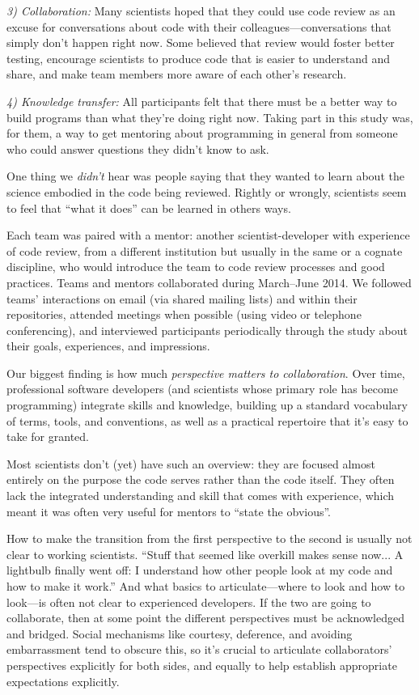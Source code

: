 \documentclass[10pt,twocolumn]{article}
\begin{document}
\noindent \emph{3) Collaboration:}
Many scientists hoped that they could use code review
as an excuse for conversations about code with their colleagues---conversations
that simply don't happen right now.
Some believed that review would foster better testing,
encourage scientists to produce code that is easier to understand and share,
and make team members more aware of each other's research.

\noindent \emph{4) Knowledge transfer:}
All participants felt that there must be a better way to build programs than what they're doing right now.
Taking part in this study was,
for them,
a way to get mentoring about programming in general from someone who could answer questions they didn't know to ask.

One thing we \emph{didn't} hear was people saying that
they wanted to learn about the science embodied in the code being reviewed.
Rightly or wrongly,
scientists seem to feel that ``what it does'' can be learned in others ways.

Each team was paired with a mentor:
another scientist-developer with experience of code review,
from a different institution but usually in the same or a cognate discipline,
who would introduce the team to code review processes and good practices.
Teams and mentors collaborated during March--June 2014.
We followed teams' interactions on email (via shared mailing lists) and within their repositories,
attended meetings when possible (using video or telephone conferencing),
and interviewed participants periodically through the study about their goals, experiences, and impressions.

Our biggest finding is how much \emph{perspective matters to collaboration}.
Over time,
professional software developers
(and scientists whose primary role has become programming)
integrate skills and knowledge,
building up a standard vocabulary of terms, tools, and conventions,
as well as a practical repertoire that it's easy to take for granted.

Most scientists don't (yet) have such an overview:
they are focused almost entirely on the purpose the code serves rather than the code itself.
They often lack the integrated understanding and skill that comes with experience,
which meant it was often very useful for mentors to ``state the obvious''.

How to make the transition from the first perspective to the second is usually not clear to working scientists.
``Stuff that seemed like overkill makes sense now...
A lightbulb finally went off:
I understand how other people look at my code and how to make it work.''
And what basics to articulate---where to look and how to look---is often not clear to experienced developers.
If the two are going to collaborate,
then at some point the different perspectives must be acknowledged and bridged.
Social mechanisms like courtesy, deference, and avoiding embarrassment tend to obscure this,
so it's crucial to articulate collaborators' perspectives explicitly for both sides,
and equally to help establish appropriate expectations explicitly.
\end{document}
